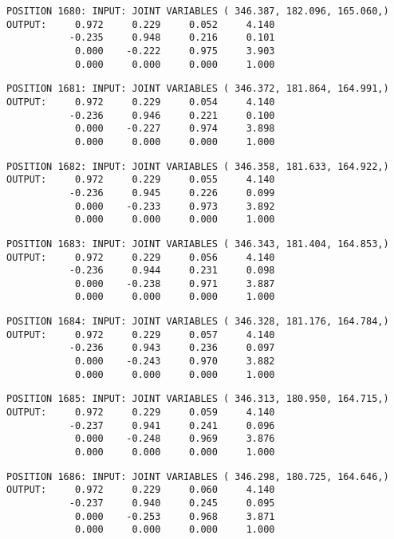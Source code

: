\begin{verbatim}
POSITION 1680: INPUT: JOINT VARIABLES ( 346.387, 182.096, 165.060,)
OUTPUT:     0.972     0.229     0.052     4.140
           -0.235     0.948     0.216     0.101
            0.000    -0.222     0.975     3.903
            0.000     0.000     0.000     1.000
\end{verbatim} \pagebreak[1]\begin{verbatim}
POSITION 1681: INPUT: JOINT VARIABLES ( 346.372, 181.864, 164.991,)
OUTPUT:     0.972     0.229     0.054     4.140
           -0.236     0.946     0.221     0.100
            0.000    -0.227     0.974     3.898
            0.000     0.000     0.000     1.000
\end{verbatim} \pagebreak[1]\begin{verbatim}
POSITION 1682: INPUT: JOINT VARIABLES ( 346.358, 181.633, 164.922,)
OUTPUT:     0.972     0.229     0.055     4.140
           -0.236     0.945     0.226     0.099
            0.000    -0.233     0.973     3.892
            0.000     0.000     0.000     1.000
\end{verbatim} \pagebreak[1]\begin{verbatim}
POSITION 1683: INPUT: JOINT VARIABLES ( 346.343, 181.404, 164.853,)
OUTPUT:     0.972     0.229     0.056     4.140
           -0.236     0.944     0.231     0.098
            0.000    -0.238     0.971     3.887
            0.000     0.000     0.000     1.000
\end{verbatim} \pagebreak[1]\begin{verbatim}
POSITION 1684: INPUT: JOINT VARIABLES ( 346.328, 181.176, 164.784,)
OUTPUT:     0.972     0.229     0.057     4.140
           -0.236     0.943     0.236     0.097
            0.000    -0.243     0.970     3.882
            0.000     0.000     0.000     1.000
\end{verbatim} \pagebreak[1]\begin{verbatim}
POSITION 1685: INPUT: JOINT VARIABLES ( 346.313, 180.950, 164.715,)
OUTPUT:     0.972     0.229     0.059     4.140
           -0.237     0.941     0.241     0.096
            0.000    -0.248     0.969     3.876
            0.000     0.000     0.000     1.000
\end{verbatim} \pagebreak[1]\begin{verbatim}
POSITION 1686: INPUT: JOINT VARIABLES ( 346.298, 180.725, 164.646,)
OUTPUT:     0.972     0.229     0.060     4.140
           -0.237     0.940     0.245     0.095
            0.000    -0.253     0.968     3.871
            0.000     0.000     0.000     1.000
\end{verbatim} \pagebreak[1]\begin{verbatim}

\end{verbatim}
